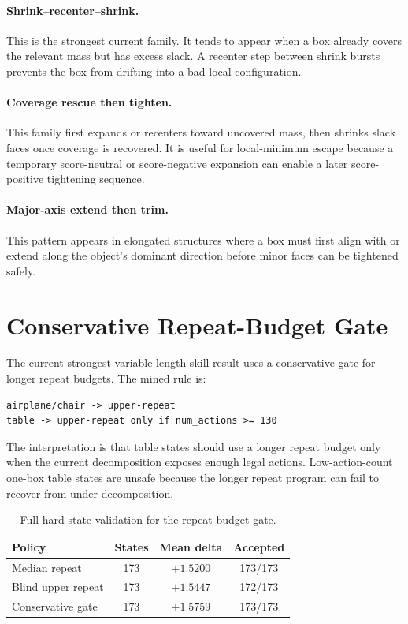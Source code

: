 \documentclass[10pt,twocolumn,letterpaper]{article}
\begin{document}
\paragraph{Shrink--recenter--shrink.}
This is the strongest current family.  It tends to appear when a box already
covers the relevant mass but has excess slack.  A recenter step between shrink
bursts prevents the box from drifting into a bad local configuration.

\paragraph{Coverage rescue then tighten.}
This family first expands or recenters toward uncovered mass, then shrinks
slack faces once coverage is recovered.  It is useful for local-minimum escape
because a temporary score-neutral or score-negative expansion can enable a
later score-positive tightening sequence.

\paragraph{Major-axis extend then trim.}
This pattern appears in elongated structures where a box must first align with
or extend along the object's dominant direction before minor faces can be
tightened safely.

\section{Conservative Repeat-Budget Gate}

The current strongest variable-length skill result uses a conservative gate for
longer repeat budgets.  The mined rule is:

\begin{verbatim}
airplane/chair -> upper-repeat
table -> upper-repeat only if num_actions >= 130
\end{verbatim}

The interpretation is that table states should use a longer repeat budget only
when the current decomposition exposes enough legal actions.  Low-action-count
one-box table states are unsafe because the longer repeat program can fail to
recover from under-decomposition.

\begin{table}[h]
\centering
\small
\begin{tabular}{lccc}
\toprule
Policy & States & Mean delta & Accepted \\
\midrule
Median repeat & 173 & $+1.5200$ & 173/173 \\
Blind upper repeat & 173 & $+1.5447$ & 172/173 \\
Conservative gate & 173 & $+1.5759$ & 173/173 \\
\bottomrule
\end{tabular}
\caption{Full hard-state validation for the repeat-budget gate.}
\end{table}
\end{document}
